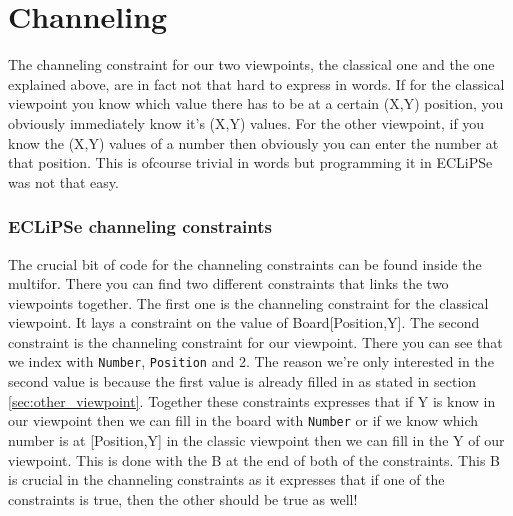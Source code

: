 \documentclass{report}
\begin{document}
\section{Channeling}
The channeling constraint for our two viewpoints, the classical one and the one explained above, are in fact not that hard to express in words. If for the classical viewpoint you know which value there has to be at a certain (X,Y) position, you obviously immediately know it's (X,Y) values. For the other viewpoint, if you know the (X,Y) values of a number then obviously you can enter the number at that position. This is ofcourse trivial in words but programming it in ECLiPSe was not that easy.

\subsubsection{ECLiPSe channeling constraints}

	The crucial bit of code for the channeling constraints can be found inside the multifor. There you can find two different constraints that links the two viewpoints together. The first one is the channeling constraint for the classical viewpoint. It lays a constraint on the value of Board[Position,Y]. The second constraint is the channeling constraint for our viewpoint. There you can see that we index with \texttt{Number}, \texttt{Position} and 2. The reason we're only interested in the second value is because the first value is already filled in as stated in section \ref{sec:other_viewpoint}. Together these constraints expresses that if Y is know in our viewpoint then we can fill in the board with \texttt{Number} or if we know which number is at [Position,Y] in the classic viewpoint then we can fill in the Y of our viewpoint. This is done with the B at the end of both of the constraints. This B is crucial in the channeling constraints as it expresses that if one of the constraints is true, then the other should be true as well!

\newpage
\end{document}

